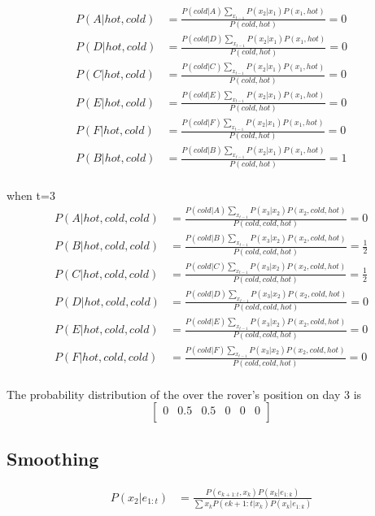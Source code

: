 \documentclass[12pt]{amsart}
\begin{document}
\begin{align*}
P(A|hot, cold) &= \frac{P(cold | A) \sum_{x_{t-1}}{P(x_2|x_1) P(x_1, hot)}}{P(cold, hot)} = 0\\
P(D|hot, cold) &= \frac{P(cold | D) \sum_{x_{t-1}}{P(x_2|x_1) P(x_1, hot)}}{P(cold, hot)} = 0\\
P(C|hot, cold) &= \frac{P(cold | C) \sum_{x_{t-1}}{P(x_2|x_1) P(x_1, hot)}}{P(cold, hot)} = 0\\
P(E|hot, cold) &= \frac{P(cold | E) \sum_{x_{t-1}}{P(x_2|x_1) P(x_1, hot)}}{P(cold, hot)} = 0\\
P(F|hot, cold) &=\frac{P(cold | F) \sum_{x_{t-1}}{P(x_2|x_1) P(x_1, hot)}}{P(cold, hot)} = 0\\
P(B|hot, cold) &= \frac{P(cold | B) \sum_{x_{t-1}}{P(x_2|x_1) P(x_1, hot)}}{P(cold, hot)} = 1\\
\end{align*}

when t=3
\begin{align*}
P(A|hot, cold, cold) &= \frac{P(cold | A) \sum_{x_{t-1}}{P(x_3|x_2) P(x_2, cold, hot)}}{P(cold, cold, hot)} = 0\\
P(B|hot, cold, cold) &= \frac{P(cold | B) \sum_{x_{t-1}}{P(x_3|x_2) P(x_2, cold, hot)}}{P(cold, cold, hot)} = \frac{1}{2}\\
P(C|hot, cold, cold) &= \frac{P(cold | C) \sum_{x_{t-1}}{P(x_3|x_2) P(x_2, cold, hot)}}{P(cold, cold, hot)} = \frac{1}{2}\\
P(D|hot, cold, cold) &= \frac{P(cold | D) \sum_{x_{t-1}}{P(x_3|x_2) P(x_2, cold, hot)}}{P(cold, cold, hot)} = 0\\
P(E|hot, cold, cold) &= \frac{P(cold | E) \sum_{x_{t-1}}{P(x_3|x_2) P(x_2, cold, hot)}}{P(cold, cold, hot)} = 0\\
P(F|hot, cold, cold) &= \frac{P(cold | F) \sum_{x_{t-1}}{P(x_3|x_2) P(x_2, cold, hot)}}{P(cold, cold, hot)} = 0\\
\end{align*}

The probability distribution of the over the rover's position on day 3 is \\
\[
\begin{bmatrix}
    0       & 0.5 & 0.5 &0 & 0 & 0 \\
\end{bmatrix}
\]

\subsection*{Smoothing}
\begin{equation} \label{eq 2}
\begin{split}
P(x_2|e_{1:t})    & = \frac{P(e_{k+1:t} , x_k) P(x_k| e_{1:k})}{\sum{x_k}{P(e{k+1:t}|x_k) P(x_k| e_{1:k})}} \\
\end{split}
\end{equation}
\end{document}
